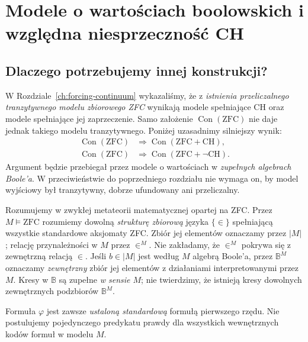 \chapter{Modele o wartościach boolowskich i względna niesprzeczność CH}
\label{ch:boolean-valued-independence}

\section{Dlaczego potrzebujemy innej konstrukcji?}

W Rozdziale~\ref{ch:forcing-continuum} wykazaliśmy, że z
\emph{istnienia przeliczalnego tranzytywnego modelu zbiorowego
ZFC} wynikają modele spełniające CH oraz modele spełniające
jej zaprzeczenie. Samo założenie
$\operatorname{Con}(\mathrm{ZFC})$ nie daje jednak takiego
modelu tranzytywnego. Poniżej uzasadnimy silniejszy wynik:
\[
\begin{aligned}
\operatorname{Con}(\mathrm{ZFC})
 &\Longrightarrow \operatorname{Con}(\mathrm{ZFC}+\mathrm{CH}),\\
\operatorname{Con}(\mathrm{ZFC})
 &\Longrightarrow \operatorname{Con}(\mathrm{ZFC}+\neg\mathrm{CH}).
\end{aligned}
\]
Argument będzie przebiegał przez modele o wartościach w
\emph{zupełnych algebrach Boole'a}. W przeciwieństwie do
poprzedniego rozdziału nie wymaga on, by model wyjściowy
był tranzytywny, dobrze ufundowany ani przeliczalny.

\begin{uwaga}
\label{rem:boolean35-metatheory}
Rozumujemy w zwykłej metateorii matematycznej opartej
na ZFC. Przez $M\models\mathrm{ZFC}$ rozumiemy dowolną
\emph{strukturę zbiorową} języka $\{\in\}$ spełniającą
wszystkie standardowe aksjomaty ZFC. Zbiór jej elementów
oznaczamy przez $|M|$; relację przynależności w $M$
przez $\in^M$. Nie zakładamy, że $\in^M$ pokrywa się z
zewnętrzną relacją $\in$. Jeśli $b\in|M|$ jest według $M$
algebrą Boole'a, przez $\mathbb B^M$ oznaczamy
\emph{zewnętrzny} zbiór jej elementów z działaniami
interpretowanymi przez $M$. Kresy w $\mathbb B$ są
zupełne \emph{w sensie $M$}; nie twierdzimy, że
istnieją kresy dowolnych zewnętrznych podzbiorów
$\mathbb B^M$.

Formuła $\varphi$ jest zawsze \emph{ustaloną standardową}
formułą pierwszego rzędu. Nie postulujemy pojedynczego
predykatu prawdy dla wszystkich wewnętrznych kodów
formuł w modelu $M$.
\end{uwaga}

